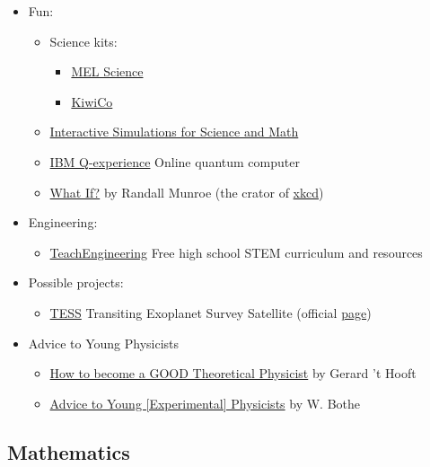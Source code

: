 \documentclass{article}
\begin{document}
\begin{itemize}
\item Fun:
\begin{itemize}
    \item Science kits:
    \begin{itemize}
        \item \href{https://melscience.com/US-en/}{MEL Science}
        \item \href{https://www.kiwico.com/kiwi}{KiwiCo}
    \end{itemize}
    \item \href{https://phet.colorado.edu/}{Interactive Simulations for Science and Math}
    \item \href{https://quantum-computing.ibm.com/}{IBM Q-experience} Online quantum computer
    \item \href{https://www.goodreads.com/book/show/21413662-what-if-serious-scientific-answers-to-absurd-hypothetical-questions}{What If?} by Randall Munroe (the crator of \href{https://xkcd.com/}{xkcd}) 
\end{itemize}

\item Engineering:
\begin{itemize}
    \item \href{https://www.teachengineering.org/}{TeachEngineering} Free high school STEM curriculum and resources
\end{itemize}

\item Possible projects:
\begin{itemize}
    \item \href{https://archive.stsci.edu/missions-and-data/tess}{TESS} Transiting Exoplanet Survey Satellite (official \href{https://tess.mit.edu/}{page}) 
\end{itemize}

\item Advice to Young Physicists
\begin{itemize}
    \item \href{https://www.goodtheorist.science/}{How to become a GOOD Theoretical Physicist} by Gerard 't Hooft
    \item \href{https://imechanica.org/files/Advice%20to%20Young%20Physicists_0.pdf}{Advice to Young [Experimental] Physicists} by W. Bothe
\end{itemize}

\end{itemize}

\subsection{Mathematics}
\end{document}
